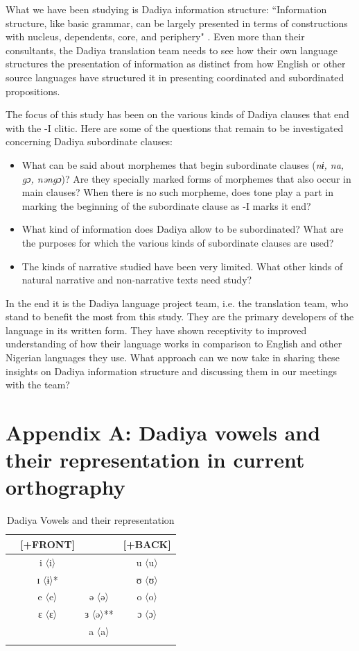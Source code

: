 \documentclass[output=paper]{langscibook}
\begin{document}
What we have been studying is Dadiya information structure: ``Information structure, like basic grammar, can be largely presented in terms of constructions with nucleus, dependents, core, and periphery" \citep[26]{Dooley2017}. Even more than their consultants, the Dadiya translation team needs to see how their own language structures the presentation of information as distinct from how English or other source languages have structured it in presenting coordinated and subordinated propositions.

The focus of this study has been on the various kinds of Dadiya clauses that end with the -I clitic. Here are some of the questions that remain to be investigated concerning Dadiya subordinate clauses:

\begin{itemize}
\item What can be said about morphemes that begin subordinate clauses (\textit{nɨ, na, gɔ, nəngɔ})? Are they specially marked forms of morphemes that also occur in main clauses? When there is no such morpheme, does tone play a part in marking the beginning of the subordinate clause as -I marks it end? 
\item What kind of information does Dadiya allow to be subordinated? What are the purposes for which the various kinds of subordinate clauses are used?
\item The kinds of narrative studied have been very limited. What other kinds of natural narrative and non-narrative texts need study?
\end{itemize}


In the end it is the Dadiya language project team, i.e. the translation team, who stand to benefit the most from this study. They are the primary developers of the language in its written form. They have shown receptivity to improved understanding of how their language works in comparison to English and other Nigerian languages they use. What approach can we now take in sharing these insights on Dadiya information structure and discussing them in our meetings with the team?

\section*{Appendix A: Dadiya vowels and their representation in current orthography}

\begin{table}
\caption{Dadiya Vowels and their representation}
\begin{tabular}{lccc}
\lsptoprule
{} & [+FRONT] & {} & [+BACK] \\\midrule\relax
[+ATR] & i	〈i〉\hphantom{*} & {} & u	〈u〉 \\ & ɪ	〈ɨ〉* & {} & ʊ	〈ʊ〉 \\\relax
[+ATR]          & e	〈e〉\hphantom{*}  & ə	〈ə〉\hphantom{**} & o	〈o〉 \\ & ɛ	〈ɛ〉\hphantom{*} & ɜ	〈ə〉** & ɔ	〈ɔ〉 \\ & {}    & a	〈a〉\hphantom{**} & {} \\
\lspbottomrule
\end{tabular}
\end{table}
\end{document}
